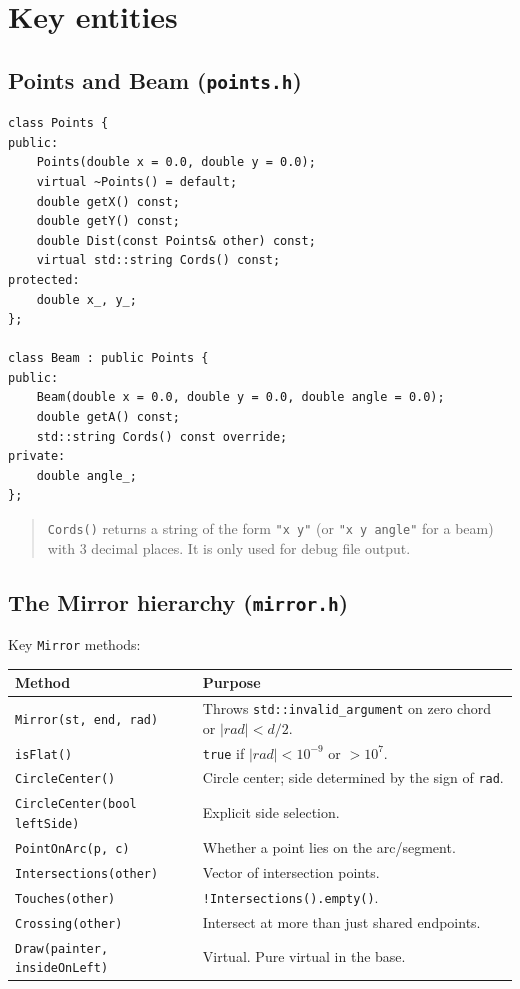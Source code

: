\documentclass[a4paper,11pt]{article}
\newcommand{\file}[1]{\texttt{#1}}
\newcommand{\code}[1]{\texttt{#1}}
\begin{document}
\section{Key entities}

\subsection{Points and Beam (\file{points.h})}

\begin{lstlisting}[caption={Points / Beam}]
class Points {
public:
    Points(double x = 0.0, double y = 0.0);
    virtual ~Points() = default;
    double getX() const;
    double getY() const;
    double Dist(const Points& other) const;
    virtual std::string Cords() const;
protected:
    double x_, y_;
};

class Beam : public Points {
public:
    Beam(double x = 0.0, double y = 0.0, double angle = 0.0);
    double getA() const;
    std::string Cords() const override;
private:
    double angle_;
};
\end{lstlisting}

\begin{quote}
\code{Cords()} returns a string of the form \code{"x y"} (or
\code{"x y angle"} for a beam) with 3 decimal places. It is only used
for debug file output.
\end{quote}

\subsection{The Mirror hierarchy (\file{mirror.h})}

Key \code{Mirror} methods:

\begin{longtable}{@{}p{6.3cm}p{8.2cm}@{}}
\toprule
\textbf{Method} & \textbf{Purpose} \\ \midrule
\endhead
\code{Mirror(st, end, rad)} & Throws \code{std::invalid\_argument} on zero chord or $|rad| < d/2$. \\
\code{isFlat()} & \code{true} if $|rad| < 10^{-9}$ or $> 10^{7}$. \\
\code{CircleCenter()} & Circle center; side determined by the sign of \code{rad}. \\
\code{CircleCenter(bool leftSide)} & Explicit side selection. \\
\code{PointOnArc(p, c)} & Whether a point lies on the arc/segment. \\
\code{Intersections(other)} & Vector of intersection points. \\
\code{Touches(other)} & \code{!Intersections().empty()}. \\
\code{Crossing(other)} & Intersect at more than just shared endpoints. \\
\code{Draw(painter, insideOnLeft)} & Virtual. Pure virtual in the base. \\
\bottomrule
\end{longtable}
\end{document}

